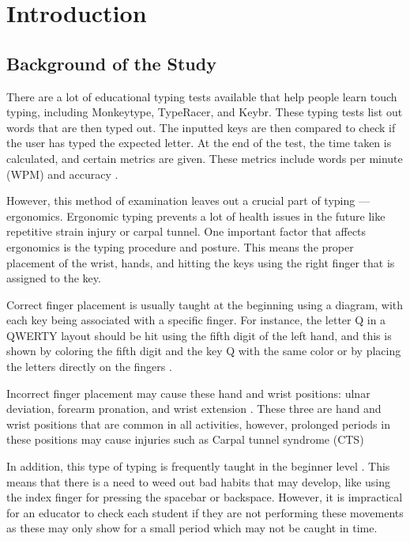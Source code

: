 \documentclass{report}
\begin{document}
\printacronyms
\newpage

\tableofcontents
\newpage


\chapter{Introduction}


\section{Background of the Study}
There are a lot of educational typing tests available that help people learn
touch typing, including Monkeytype, TypeRacer, and Keybr. These typing tests list
out words that are then typed out. The inputted keys are then compared to check
if the user has typed the expected letter. At the end of the test, the time
taken is calculated, and certain metrics are given. These metrics include words
per minute (WPM) and accuracy \parencite{bartnik2021}.

However, this method of examination leaves out a crucial part of typing —
ergonomics. Ergonomic typing prevents a lot of health issues in the future like
repetitive strain injury or carpal tunnel. One important factor that affects
ergonomics is the typing procedure and posture. This means the proper placement of
the wrist, hands, and hitting the keys using the right finger that is assigned
to the key.

Correct finger placement is usually taught at the beginning using a diagram,
with each key being associated with a specific finger. For instance, the letter
Q in a QWERTY layout should be hit using the fifth digit of the left hand, and
this is shown by coloring the fifth digit and the key Q with the same color or
by placing the letters directly on the fingers \parencite{dobson2009touch}.

Incorrect finger placement may cause these hand and wrist positions: ulnar
deviation, forearm pronation, and wrist extension \parencite{serina1999}. These
three are hand and wrist positions that are common in all activities, however,
prolonged periods in these positions may cause injuries such as Carpal
tunnel syndrome (CTS) \parencite{toosi2015}

In addition, this type of typing is frequently taught in the beginner level
\parencite{donica2018}. This means that there is a need to weed out bad habits
that may develop, like using the index finger for pressing the spacebar or
backspace. However, it is impractical for an educator to check each student if
they are not performing these movements as these may only show for a small
period which may not be caught in time.
\end{document}
